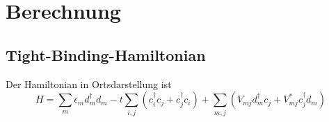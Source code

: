 \chapter{Berechnung}
\label{chap:berechnung}
\section{Tight-Binding-Hamiltonian}
\label{sec:hamiltonian}
Der Hamiltonian in Ortsdarstellung ist 
\begin{equation}
    H = \sum_m \epsilon_m d_m^\dagger d_m - t \sum_{i,j} \left ( c_i^\dagger c_j + c_j^\dagger c_i \right )
    + \sum_{m,j} \left ( V_{mj} d_m^\dagger c_j + V^*_{mj} c_j^\dagger d_m  \right)
\end{equation}
\cite{anders-fkt}